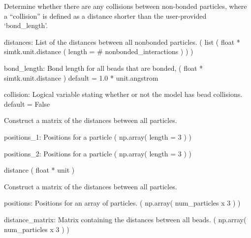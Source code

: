 \documentclass[letterpaper,12pt,english,openany,oneside]{sphinxmanual}
\begin{document}
\begin{fulllineitems}
\label{\detokenize{utilities:utilities.util.collisions}}
Determine whether there are any collisions between non-bonded
particles, where a “collision” is defined as a distance shorter
than the user-provided ‘bond\_length’.

distances: List of the distances between all nonbonded particles.
( list ( float * simtk.unit.distance ( length = \# nonbonded\_interactions ) ) )

bond\_length: Bond length for all beads that are bonded,
( float * simtk.unit.distance )
default = 1.0 * unit.angstrom

collision: Logical variable stating whether or not the model has
bead collisions.
default = False

\end{fulllineitems}


\begin{fulllineitems}
\label{\detokenize{utilities:utilities.util.distance}}
Construct a matrix of the distances between all particles.

positions\_1: Positions for a particle
( np.array( length = 3 ) )

positions\_2: Positions for a particle
( np.array( length = 3 ) )

distance
( float * unit )

\end{fulllineitems}


\begin{fulllineitems}
\label{\detokenize{utilities:utilities.util.distance_matrix}}
Construct a matrix of the distances between all particles.

positions: Positions for an array of particles.
( np.array( num\_particles x 3 ) )

distance\_matrix: Matrix containing the distances between all beads.
( np.array( num\_particles x 3 ) )

\end{fulllineitems}
\end{document}
